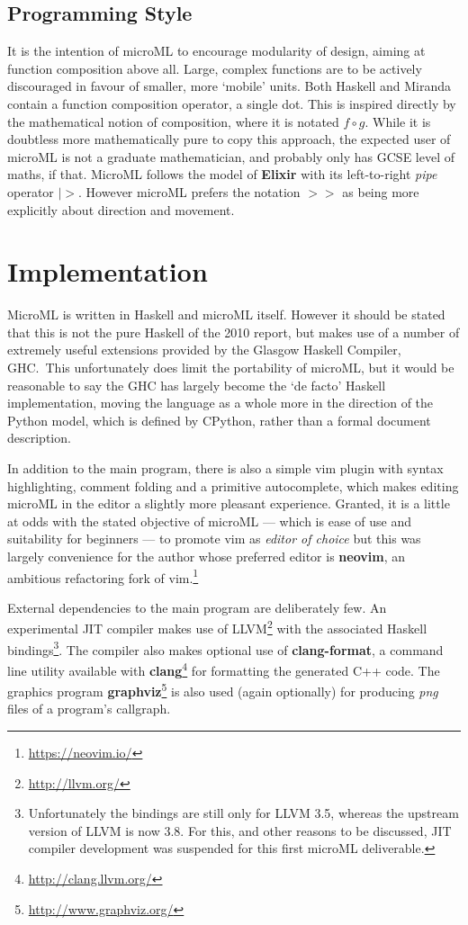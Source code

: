 \documentclass[12pt, a4paper]{report}
\begin{document}
\subsection{Programming Style}
It is the intention of microML to encourage modularity of design, aiming at function composition
above all. Large, complex functions are to be actively discouraged in favour of smaller, more
`mobile' units. Both Haskell and Miranda contain a function composition operator, a single dot.
This is inspired directly by the mathematical notion of composition, where it is notated $ f \circ
g $. While it is doubtless more mathematically pure to copy this approach, the expected user of
microML is not a graduate mathematician, and probably only has GCSE level of maths, if that. MicroML
follows the model of \textbf{Elixir} with its left-to-right \textit{pipe} operator $|>$. However
microML prefers the notation $>>$ as being more explicitly about direction and movement.

\section{Implementation}
MicroML is written in Haskell and microML itself. However it should be stated that this is not the
pure Haskell of the 2010 report\cite{Marlow_haskell2010}, but makes use of a number of extremely
useful extensions provided by the Glasgow Haskell Compiler, GHC.\ This unfortunately does limit the
portability of microML, but it would be reasonable to say the GHC has largely become the `de facto'
Haskell implementation, moving the language as a whole more in the direction of the Python model,
which is defined by CPython, rather than a formal document description.

In addition to the main program, there is also a simple vim plugin with syntax highlighting,
comment folding and a primitive autocomplete, which makes editing microML in the editor a slightly
more pleasant experience. Granted, it is a little at odds with the stated objective of microML ---
which is ease of use and suitability for beginners --- to promote vim as \textit{editor of choice} but
this was largely convenience for the author whose preferred editor is \textbf{neovim}, an ambitious
refactoring fork of vim.\footnote{\url{https://neovim.io/}}

External dependencies to the main program are deliberately few. An experimental JIT
compiler makes use of LLVM\footnote{\url{http://llvm.org/}} with the associated Haskell
bindings\footnote{Unfortunately the bindings are still only for LLVM 3.5, whereas the
upstream version of LLVM is now 3.8. For this, and other reasons to be discussed, JIT
compiler development was suspended for this first microML deliverable.}. The compiler
also makes optional use of \textbf{clang-format}, a command line utility available with
\textbf{clang}\footnote{\url{http://clang.llvm.org/}} for formatting the generated C++ code. The
graphics program \textbf{graphviz}\footnote{\url{http://www.graphviz.org/}} is also used (again
optionally) for producing \textit{png} files of a program's callgraph.
\end{document}
